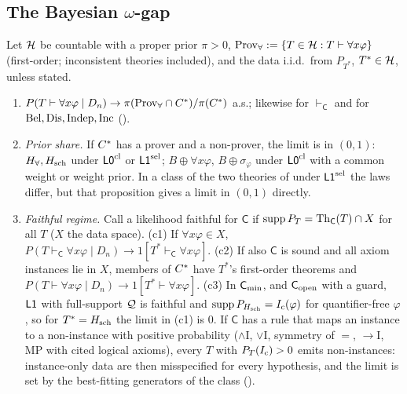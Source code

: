 \subsection{The Bayesian \texorpdfstring{$\omega$}{omega}-gap}\label{sec:univ:omega}

\begin{theorem}\label{thm:univ:omega}
Let $\mathcal{H}$ be countable with a proper prior $\pi>0$, $\mathrm{Prov}_{\forall}:=\{T\in\mathcal{H}:T\vdash\forall x\varphi\}$ (first-order; inconsistent theories included), and the data i.i.d.\ from $P_{T^*}$, $T^*\in\mathcal{H}$, unless stated.
\begin{enumerate}[label=(\alph*),leftmargin=*,itemsep=1pt]
\item $P(T\vdash\forall x\varphi\mid D_n)\to\pi(\mathrm{Prov}_{\forall}\cap C^{*})/\pi(C^{*})$ a.s.; likewise for $\vdash_{\mathsf C}$ and for $\mathrm{Bel},\mathrm{Dis},\mathrm{Indep},\mathrm{Inc}$ ().
\item \emph{Prior share.} If $C^{*}$ has a prover and a non-prover, the limit is in $(0,1)$: $H_{\forall},H_{\mathrm{sch}}$ under $\mathord{\mathsf{L0}}^{\mathrm{cl}}$ or $\mathord{\mathsf{L1}}^{\mathrm{sel}}$; $B\oplus\forall x\varphi$, $B\oplus\sigma_\varphi$ under $\mathord{\mathsf{L0}}^{\mathrm{cl}}$ with a common weight or weight prior. In a class of the two theories of  under $\mathord{\mathsf{L1}}^{\mathrm{sel}}$ the laws differ, but that proposition gives a limit in $(0,1)$ directly.
\item \emph{Faithful regime.} Call a likelihood faithful for $\mathsf C$ if $\operatorname{supp}P_T=\mathrm{Th}_{\mathsf C}(T)\cap X$ for all $T$ ($X$ the data space). (c1) If $\forall x\varphi\in X$, $P(T\vdash_{\mathsf C}\forall x\varphi\mid D_n)\to1[T^*\vdash_{\mathsf C}\forall x\varphi]$. (c2) If also $\mathsf C$ is sound and all axiom instances lie in $X$, members of $C^{*}$ have $T^*$'s first-order theorems and $P(T\vdash\forall x\varphi\mid D_n)\to1[T^*\vdash\forall x\varphi]$. (c3) In $\mathsf{C}_{\min}$, and $\mathsf{C}_{\mathrm{open}}$ with a guard, $\mathord{\mathsf{L1}}$ with full-support $\mathcal{Q}$ is faithful and $\operatorname{supp}P_{H_{\mathrm{sch}}}=I_{\mathrm{c}}(\varphi)$ for quantifier-free $\varphi$, so for $T^*=H_{\mathrm{sch}}$ the limit in (c1) is $0$. If $\mathsf C$ has a rule that maps an instance to a non-instance with positive probability ($\wedge$I, $\vee$I, symmetry of $=$, $\to$I, MP with cited logical axioms), every $T$ with $P_T(I_{\mathrm{c}})>0$ emits non-instances: instance-only data are then misspecified for every hypothesis, and the limit is set by the best-fitting generators of the class ().

\end{enumerate}
\end{theorem}
